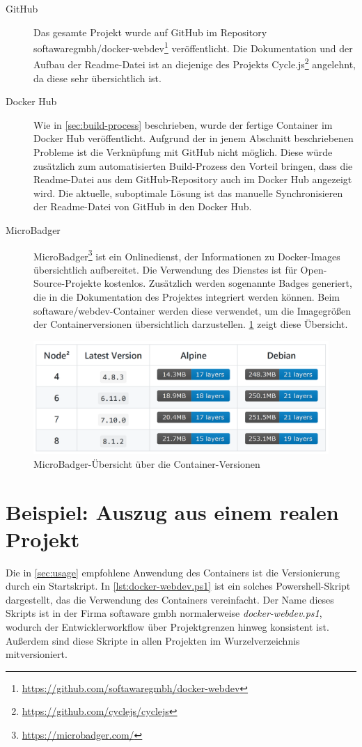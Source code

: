 \begin{description}
    \item[GitHub] Das gesamte Projekt wurde auf GitHub im Repository softawaregmbh/docker-webdev\footnote{\url{https://github.com/softawaregmbh/docker-webdev}} veröffentlicht.
        Die Dokumentation und der Aufbau der Readme-Datei ist an diejenige des Projekts Cycle.js\footnote{\url{https://github.com/cyclejs/cyclejs}} angelehnt, da diese sehr übersichtlich ist.
    \item[Docker Hub] Wie in \cref{sec:build-process} beschrieben, wurde der fertige Container im Docker Hub veröffentlicht.
        Aufgrund der in jenem Abschnitt beschriebenen Probleme ist die Verknüpfung mit GitHub nicht möglich.
        Diese würde zusätzlich zum automatisierten Build-Prozess den Vorteil bringen, dass die Readme-Datei aus dem GitHub-Repository auch im Docker Hub angezeigt wird.
        Die aktuelle, suboptimale Lösung ist das manuelle Synchronisieren der Readme-Datei von GitHub in den Docker Hub.
    \item[MicroBadger] MicroBadger\footnote{\url{https://microbadger.com/}} ist ein Onlinedienst, der Informationen zu Docker-Images übersichtlich aufbereitet.
        Die Verwendung des Dienstes ist für Open-Source-Projekte kostenlos.
        Zusätzlich werden sogenannte Badges generiert, die in die Dokumentation des Projektes integriert werden können.
        Beim softaware/webdev-Container werden diese verwendet, um die Imagegrößen der Containerversionen übersichtlich darzustellen.
        \cref{fig:microbdager-versions} zeigt diese Übersicht.
\end{description}

\begin{figure}[htbp]
    \centering
    \includegraphics[width=0.75\linewidth,clip]{images/container-versions}
    \caption{MicroBadger-Übersicht über die Container-Versionen}
\label{fig:microbdager-versions}
\end{figure}


\section{Beispiel: Auszug aus einem realen Projekt}
\label{sec:example}
Die in \cref{sec:usage} empfohlene Anwendung des Containers ist die Versionierung durch ein Startskript.
In \cref{lst:docker-webdev.ps1} ist ein solches Powershell-Skript dargestellt, das die Verwendung des Containers vereinfacht.
Der Name dieses Skripts ist in der Firma softaware gmbh normalerweise \emph{docker-webdev.ps1}, wodurch der Entwicklerworkflow über Projektgrenzen hinweg konsistent ist.
Außerdem sind diese Skripte in allen Projekten im Wurzelverzeichnis mitversioniert.

